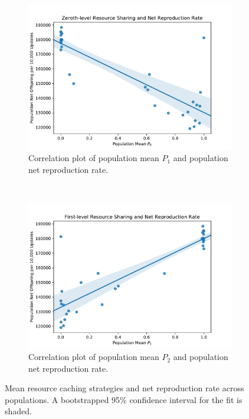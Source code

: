 \begin{figure}[!htb]
\begin{center}

\begin{subfigure}[b]{0.45\columnwidth}
  \includegraphics[width=\columnwidth]{img/mean_res_pool1_vs_net_reproduction}
  \caption{
  Correlation plot of population mean $P_1$ and population net reproduction rate.
  }
  \label{fig:mean_res_pool1_vs_net_reproduction}
\end{subfigure}
~~
\begin{subfigure}[b]{0.45\columnwidth}
  \includegraphics[width=\columnwidth]{img/mean_res_pool2_vs_net_reproduction}
  \caption{
  Correlation plot of population mean $P_2$ and population net reproduction rate.
  }
  \label{fig:mean_res_pool2_vs_net_reproduction}
\end{subfigure}
\caption{
Mean resource caching strategies and net reproduction rate across populations.
A bootstrapped 95\% confidence interval for the fit is shaded.
}
\label{fig:net_reproduction}
\end{center}
\end{figure}

